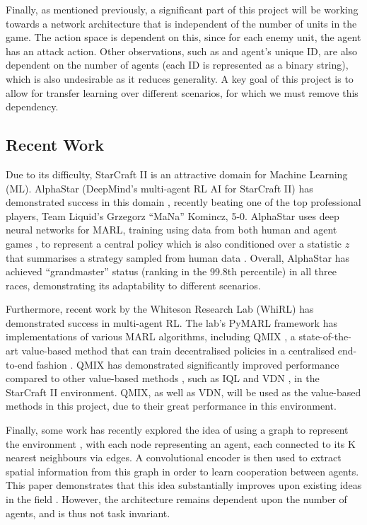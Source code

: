 Finally, as mentioned previously, a significant part of this project will be working towards a network architecture that is independent of the number of units in the game. The action space is dependent on this, since for each enemy unit, the agent has an attack action. Other observations, such as and agent's unique ID, are also dependent on the number of agents (each ID is represented as a binary string), which is also undesirable as it reduces generality. A key goal of this project is to allow for transfer learning over different scenarios, for which we must remove this dependency.

\subsection{Recent Work}

Due to its difficulty, StarCraft II is an attractive domain for Machine Learning (ML). AlphaStar (DeepMind's multi-agent RL AI for StarCraft II) has demonstrated success in this domain \cite{alphastar}, recently beating one of the top professional players, Team Liquid’s Grzegorz ``MaNa'' Komincz, 5-0. AlphaStar uses deep neural networks for MARL, training using data from both human and agent games \cite{alphastar}, to represent a central policy which is also conditioned over a statistic $z$ that summarises a strategy sampled from human data \cite{alphastar}. Overall, AlphaStar has achieved ``grandmaster'' status (ranking in the 99.8th percentile) in all three races, demonstrating its adaptability to different scenarios.


Furthermore, recent work by the Whiteson Research Lab (WhiRL) has demonstrated success in multi-agent RL. The lab's PyMARL framework \cite{smac} has implementations of various MARL algorithms, including QMIX \cite{qmixcite}, a state-of-the-art value-based method that can train decentralised policies in a centralised end-to-end fashion \cite{qmixcite}. QMIX has demonstrated significantly improved performance compared to other value-based methods \cite{qmixcite}, such as IQL \cite{IQL} and VDN \cite{vdn}, in the StarCraft II environment. QMIX, as well as VDN, will be used as the value-based methods in this project, due to their great performance in this environment.

Finally, some work has recently explored the idea of using a graph to represent the environment \cite{graph}, with each node representing an agent, each connected to its K nearest neighbours via edges. A convolutional encoder is then used to extract spatial information from this graph in order to learn cooperation between agents. This paper demonstrates that this idea substantially improves upon existing ideas in the field \cite{graph}. However, the architecture remains dependent upon the number of agents, and is thus not task invariant.



